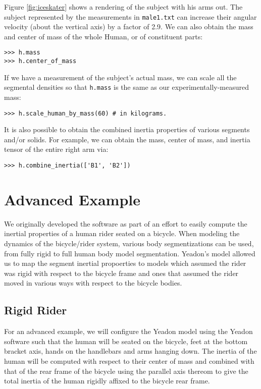 \documentclass[10pt]{article}
\begin{document}
Figure \ref{fig:iceskater} shows a rendering of the subject with his arms
out. The subject represented by the measurements in \verb+male1.txt+ can
increase their angular velocity (about the vertical axis) by a factor of 2.9.
We can also obtain the mass and center of mass of the whole Human, or of
constituent parts:

\begin{verbatim}
>>> h.mass
>>> h.center_of_mass
\end{verbatim}

If we have a measurement of the subject's actual mass, we can scale all the
segmental densities so that \verb+h.mass+ is the same as our
experimentally-measured mass:

\begin{verbatim}
>>> h.scale_human_by_mass(60) # in kilograms.
\end{verbatim}

It is also possible to obtain the combined inertia properties of various
segments and/or solids. For example, we can obtain the mass, center of mass,
and inertia tensor of the entire right arm via:

\begin{verbatim}
>>> h.combine_inertia(['B1', 'B2'])
\end{verbatim}


\section*{Advanced Example}
\label{sec:advanced-example}

We originally developed the software as part of an effort to easily compute the
inertial properties of a human rider seated on a bicycle. When modeling the
dynamics of the bicycle/rider system, various body segmentizations can be used,
from fully rigid to full human body model segmentation. Yeadon's model allowed
us to map the segment inertial propoerties to models which assumed the rider
was rigid with respect to the bicycle frame and ones that assumed the rider
moved in various ways with respect to the bicycle bodies.

\subsection*{Rigid Rider}
\label{sec:rigid-rider}

For an advanced example, we will configure the Yeadon model using the Yeadon
software such that the human will be seated on the bicycle, feet at the bottom
bracket axis, hands on the handlebars and arms hanging down. The inertia of the
human will be computed with respect to their center of mass and combined with
that of the rear frame of the bicycle using the parallel axis thereom to give
the total inertia of the human rigidly affixed to the bicycle rear frame.
\end{document}
